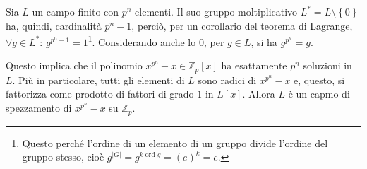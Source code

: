 \documentclass[11pt, a4paper]{scrartcl}
\theoremstyle{definition}
\numberwithin{esempio}{section}
\theoremstyle{definition}
\numberwithin{obs}{section}
\numberwithin{nota}{section}
\numberwithin{equation}{subsection}
\begin{document}
\noindent Sia $L$ un campo finito con $p^n$ elementi.
Il suo gruppo moltiplicativo $L^* = L \setminus \left\{ 0 \right\} $ ha, quindi, cardinalit\`a $p^n -1$, perci\`o, per un corollario del teorema di Lagrange, $\forall g \in L^*$: $g^{p^n - 1} = 1$\footnote{Questo perch\'e l'ordine di un elemento di un gruppo divide l'ordine del gruppo stesso, cio\`e $g ^{|G|} = g^{k \operatorname{ord}g } =(e)^k =e$.}.
Considerando anche lo $0$, per $g \in L$, si ha $g^{p^n} = g$.

Questo implica che il polinomio $x^{p^n} - x \in \mathbb{Z}_p[x]$ ha esattamente $p^n$ soluzioni in $L$.
Pi\`u in particolare, tutti gli elementi di $L$ sono radici di $x^{p^n} -x$ e, questo, si fattorizza come prodotto di fattori di grado $1$ in $L[x]$.
Allora $L$ \`e un capmo di spezzamento di $x^{p^n} -x$ su $\mathbb{Z}_p$.
\end{document}
